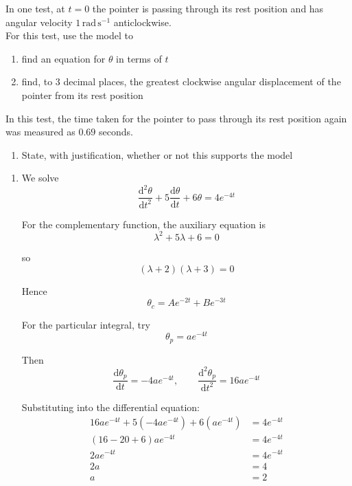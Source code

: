 \documentclass[leqno]{article}
\begin{document}
\begin{enumerate}[
  label=\textbf{\arabic*.},
  leftmargin=*,
  topsep=0pt,
  partopsep=0pt,
  parsep=0pt
]
In one test, at $t=0$ the pointer is passing through its rest position and has angular velocity $1\,\mathrm{rad\,s^{-1}}$ anticlockwise. \\

For this test, use the model to
\begin{enumerate}[label=\textbf{(\alph*)}]
  \item find an equation for $\theta$ in terms of $t$  \\
  \item find, to $3$ decimal places, the greatest clockwise angular displacement of the pointer from its rest position  \\
\end{enumerate}
In this test, the time taken for the pointer to pass through its rest position again was measured as $0.69$ seconds. \\
\begin{enumerate}[label=\textbf{(\alph*)}, resume]
  \item State, with justification, whether or not this supports the model  \\
\end{enumerate}

\vspace*{10pt}

\begin{djsSolution}
\begin{enumerate}[label=\textbf{(\alph*)}]
\item We solve
\[
\frac{\mathrm{d}^2\theta}{\mathrm{d}t^2}+5\frac{\mathrm{d}\theta}{\mathrm{d}t}+6\theta=4e^{-4t}
\]

For the complementary function, the auxiliary equation is
\[
\lambda^2+5\lambda+6=0
\]

so
\[
(\lambda+2)(\lambda+3)=0
\]

Hence
\[
\theta_c=Ae^{-2t}+Be^{-3t}
\]

For the particular integral, try
\[
\theta_p=ae^{-4t}
\]

Then
\[
\frac{\mathrm{d}\theta_p}{\mathrm{d}t}=-4ae^{-4t},
\qquad
\frac{\mathrm{d}^2\theta_p}{\mathrm{d}t^2}=16ae^{-4t}
\]

Substituting into the differential equation:
\begin{align*}
16ae^{-4t}+5(-4ae^{-4t})+6(ae^{-4t})&=4e^{-4t}\\
(16-20+6)ae^{-4t}&=4e^{-4t}\\
2ae^{-4t}&=4e^{-4t}\\
2a&=4\\
a&=2
\end{align*}


\end{enumerate}
\end{djsSolution}
\end{enumerate}
\end{document}
